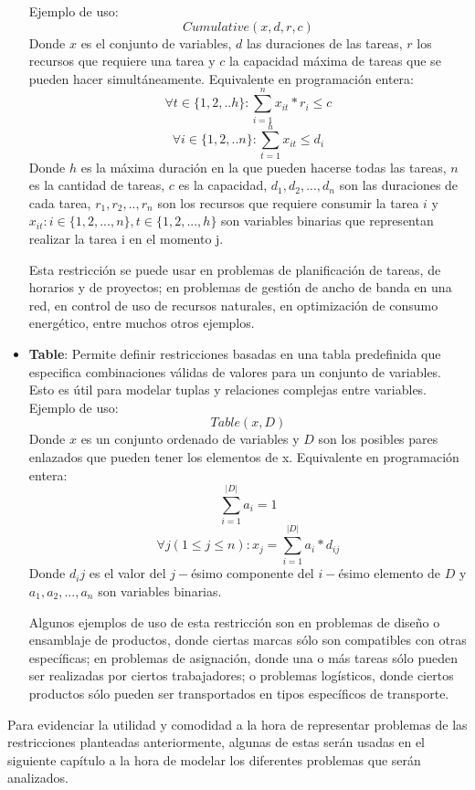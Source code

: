 \documentclass[12pt]{report}
\begin{document}
\begin{itemize}
    Ejemplo de uso:
    $$Cumulative(x,d,r, c)$$
    Donde $x$ es el conjunto de variables, $d$ las duraciones de las tareas, $r$ los recursos que requiere una tarea y $c$ la capacidad máxima de tareas que se pueden hacer simultáneamente.
    Equivalente en programación entera:
    $$\forall t \in \{1,2,..h\}:\sum_{i=1}^nx_{it}*r_i\leq c$$
    $$\forall i \in \{1,2,..n\}:\sum_{t=1}^hx_{it}\leq d_i$$
    Donde $h$ es la máxima duración en la que pueden hacerse todas las tareas, $n$ es la cantidad de tareas, $c$ es la capacidad, $d_1,d_2,...,d_n$ son las duraciones de cada tarea, $r_1,r_2,..,r_n$ son los recursos que requiere consumir la tarea $i$ y $x_{it}:i\in\{1,2,...,n\},t\in\{1,2,...,h\}$ son variables binarias que representan realizar la tarea i en el momento j.

    Esta restricción se puede usar en problemas de planificación de tareas, de horarios y de proyectos; en problemas de gestión de ancho de banda en una red, en control de uso de recursos naturales, en optimización de consumo energético, entre muchos otros ejemplos.\\
    
    \item \textbf{Table}: Permite definir restricciones basadas en una tabla predefinida que especifica combinaciones válidas de valores para un conjunto de variables. Esto es útil para modelar tuplas y relaciones complejas entre variables.
    Ejemplo de uso:
    $$Table(x,D)$$
    Donde $x$ es un conjunto ordenado de variables y $D$ son los posibles pares enlazados que pueden tener los elementos de x. 
    Equivalente en programación entera:
    $$\sum_{i=1}^{|D|}a_{i}=1$$
    $$\forall j(1\leq j\leq n):x_j=\sum_{i=1}^{|D|}a_i*d_{ij}$$
    Donde $d_ij$ es el valor del $j-$ésimo componente del $i-$ésimo elemento de $D$ y $a_1,a_2,...,a_n$ son variables binarias.

    Algunos ejemplos de uso de esta restricción son en problemas de diseño o ensamblaje de productos, donde ciertas marcas sólo son compatibles con otras específicas; en problemas de asignación, donde una o más tareas sólo pueden ser realizadas por ciertos trabajadores; o problemas logísticos, donde ciertos productos sólo pueden ser transportados en tipos específicos de transporte.
    
\end{itemize}

Para evidenciar la utilidad y comodidad a la hora de representar problemas de las restricciones planteadas anteriormente, algunas de estas serán usadas en el siguiente capítulo a la hora de modelar los diferentes problemas que serán analizados. 
\end{document}
